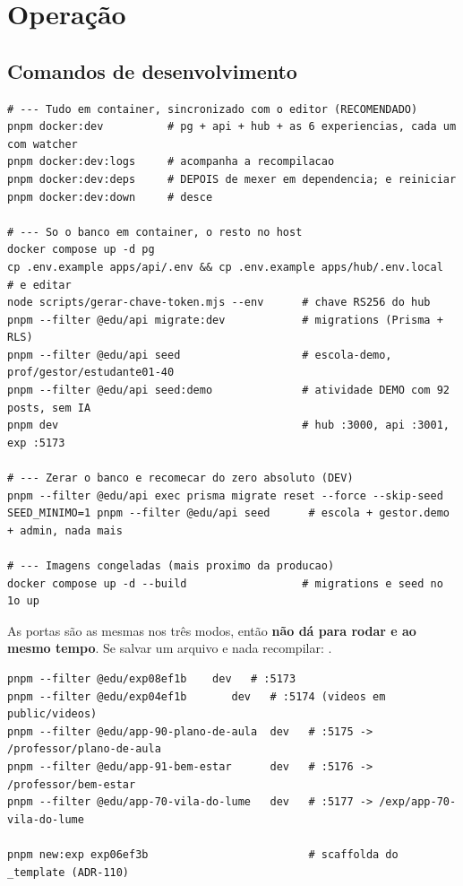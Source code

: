 \chapter{Operação}
\label{ap:operacao}

\section{Comandos de desenvolvimento}

\begin{lstlisting}[language=bashunoo, caption={Subir a plataforma}]
# --- Tudo em container, sincronizado com o editor (RECOMENDADO)
pnpm docker:dev          # pg + api + hub + as 6 experiencias, cada um com watcher
pnpm docker:dev:logs     # acompanha a recompilacao
pnpm docker:dev:deps     # DEPOIS de mexer em dependencia; e reiniciar
pnpm docker:dev:down     # desce

# --- So o banco em container, o resto no host
docker compose up -d pg
cp .env.example apps/api/.env && cp .env.example apps/hub/.env.local   # e editar
node scripts/gerar-chave-token.mjs --env      # chave RS256 do hub
pnpm --filter @edu/api migrate:dev            # migrations (Prisma + RLS)
pnpm --filter @edu/api seed                   # escola-demo, prof/gestor/estudante01-40
pnpm --filter @edu/api seed:demo              # atividade DEMO com 92 posts, sem IA
pnpm dev                                      # hub :3000, api :3001, exp :5173

# --- Zerar o banco e recomecar do zero absoluto (DEV)
pnpm --filter @edu/api exec prisma migrate reset --force --skip-seed
SEED_MINIMO=1 pnpm --filter @edu/api seed      # escola + gestor.demo + admin, nada mais

# --- Imagens congeladas (mais proximo da producao)
docker compose up -d --build                  # migrations e seed no 1o up
\end{lstlisting}

\begin{atencao}
As portas são as mesmas nos três modos, então \textbf{não dá para rodar
 e  ao mesmo tempo}. Se salvar um arquivo e nada
recompilar: .
\end{atencao}

\begin{lstlisting}[language=bashunoo, caption={Experiências, uma a uma}]
pnpm --filter @edu/exp08ef1b    dev   # :5173
pnpm --filter @edu/exp04ef1b       dev   # :5174 (videos em public/videos)
pnpm --filter @edu/app-90-plano-de-aula  dev   # :5175 -> /professor/plano-de-aula
pnpm --filter @edu/app-91-bem-estar      dev   # :5176 -> /professor/bem-estar
pnpm --filter @edu/app-70-vila-do-lume   dev   # :5177 -> /exp/app-70-vila-do-lume

pnpm new:exp exp06ef3b                         # scaffolda do _template (ADR-110)
\end{lstlisting}

